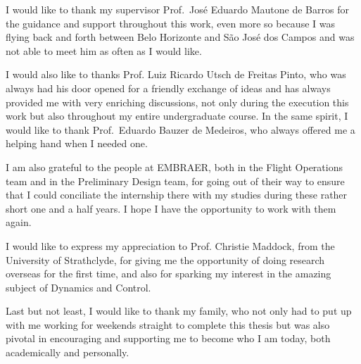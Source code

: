 \documentclass[tcc]{subfile}
\begin{document}
\begin{agradecimentos}

    I would like to thank my supervisor Prof.\ José Eduardo Mautone de Barros for
    the guidance and support throughout this work, even more so because I was
    flying back and forth between Belo Horizonte and  São José dos Campos 
    and was not able to meet him as often as I would like.

    I would also like to thanks Prof. Luiz Ricardo Utsch de Freitas Pinto, who was
    always had his door opened for a friendly exchange of ideas and has always provided
    me with very enriching discussions, not only during the execution this work
    but also throughout my entire undergraduate course.  In the same spirit, I
    would like to thank Prof.\ Eduardo Bauzer de Medeiros, who always offered
    me a helping hand when I needed one.

    I am also grateful to the people at EMBRAER, both in the Flight Operations
    team and in the Preliminary Design team, for going out of their
    way to ensure that I could conciliate the internship there with my studies
    during these rather short one and a half years. I
    hope I have the opportunity to work with them again.

    I would like to express my appreciation to Prof. Christie Maddock, from the
    University of Strathclyde, for giving me the opportunity of doing research overseas for the first time,
    and also for sparking my interest in the amazing subject of Dynamics and Control.

    Last but not least, I would like to thank my family, who not only had to put up
    with me working for weekends straight to complete this thesis but was also
    pivotal in encouraging and supporting me to become who I am today, both
    academically and personally. 

\end{agradecimentos}
\end{document}
